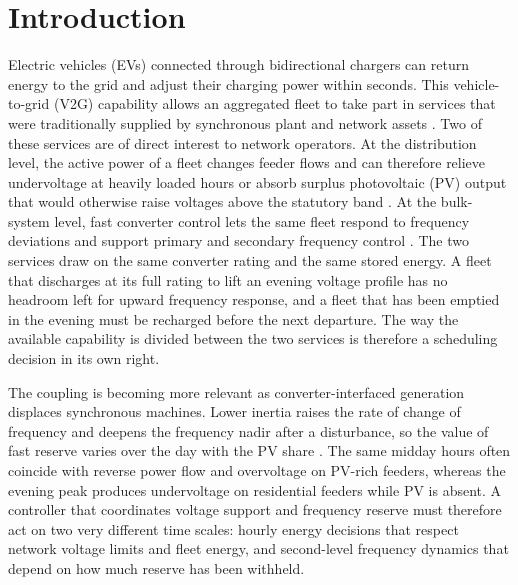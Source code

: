 \section{Introduction}
\label{sec:introduction}

Electric vehicles (EVs) connected through bidirectional chargers can
return energy to the grid and adjust their charging power within
seconds. This vehicle-to-grid (V2G) capability allows an aggregated
fleet to take part in services that were traditionally supplied by
synchronous plant and network assets \cite{Kempton2005}. Two of these
services are of direct interest to network operators. At the
distribution level, the active power of a fleet changes feeder flows
and can therefore relieve undervoltage at heavily loaded hours or absorb
surplus photovoltaic (PV) output that would otherwise raise voltages
above the statutory band \cite{AmamraMarco2019,HuEtAl2022,AnEtAl2024}.
At the bulk-system level, fast converter control lets the same fleet
respond to frequency deviations and support primary and secondary
frequency control \cite{Lam2016,Izadkhast2015}. The two services draw
on the same converter rating and the same stored energy. A fleet that
discharges at its full rating to lift an evening voltage profile has no
headroom left for upward frequency response, and a fleet that has been
emptied in the evening must be recharged before the next departure.
The way the available capability is divided between the two services
is therefore a scheduling decision in its own right.

The coupling is becoming more relevant as converter-interfaced
generation displaces synchronous machines. Lower inertia raises the
rate of change of frequency and deepens the frequency nadir after a
disturbance, so the value of fast reserve varies over the day with the
PV share \cite{Tielens2016}. The same midday hours often coincide with
reverse power flow and overvoltage on PV-rich feeders, whereas the
evening peak produces undervoltage on residential feeders while PV is
absent. A controller that coordinates voltage support and frequency
reserve must therefore act on two very different time scales: hourly
energy decisions that respect network voltage limits and fleet energy,
and second-level frequency dynamics that depend on how much reserve has
been withheld.

